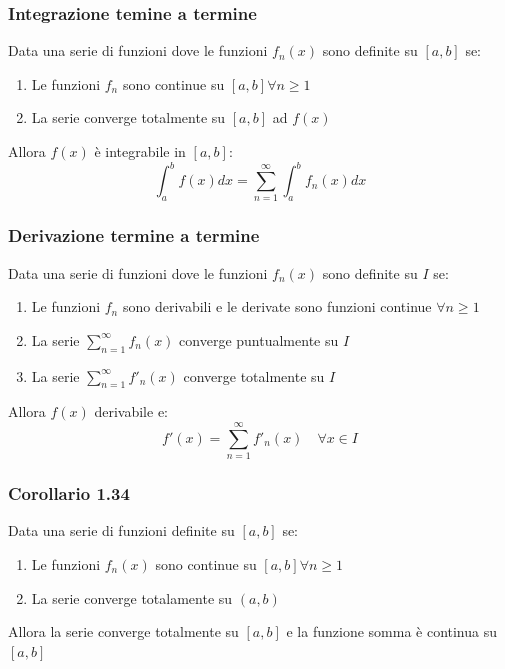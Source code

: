 \documentclass[10pt, a4paper]{article}
\begin{document}
        \subsubsection{Integrazione temine a termine}
            Data una serie di funzioni dove le funzioni $f_n(x)$ sono definite su $[a,b]$ se:
            \begin{enumerate}
                \item Le funzioni $f_n$ sono continue su $[a,b]\forall n\geq 1$
                \item La serie converge totalmente su $[a,b]$ ad $f(x)$
            \end{enumerate}
            Allora $f(x)$ è integrabile in $[a,b]$:
            \begin{equation*}
                \int_{a}^{b}f(x)dx = \sum_{n=1}^{\infty}\int_{a}^{b}f_n(x)dx
            \end{equation*}
        \subsubsection{Derivazione termine a termine}
            Data una serie di funzioni dove le funzioni $f_n(x)$ sono definite su $I$ se:
            \begin{enumerate}
                \item Le funzioni $f_n$ sono derivabili e le derivate sono funzioni continue $\forall n\geq 1$
                \item La serie $\sum_{n=1}^{\infty}f_n(x)$ converge puntualmente su $I$
                \item La serie $\sum_{n=1}^{\infty}f'_n(x)$ converge totalmente su $I$
            \end{enumerate}
            Allora $f(x)$ derivabile e:
            \begin{equation*}
                f'(x) = \sum_{n=1}^{\infty}f'_n(x) \quad \forall x\in I
            \end{equation*}
        \subsubsection{Corollario 1.34}
            Data una serie di funzioni definite su $[a,b]$ se:
            \begin{enumerate}
                \item Le funzioni $f_n(x)$ sono continue su $[a,b]\forall n\geq 1$
                \item La serie converge totalamente su $(a,b)$
            \end{enumerate}
            Allora la serie converge totalmente su $[a,b]$ e la funzione somma è continua su $[a,b]$
\end{document}
